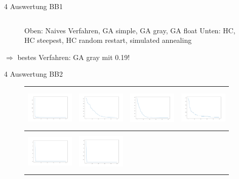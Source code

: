 \documentclass{ocbeameruni}
\begin{document}
\begin{frame}{4 Auswertung BB1}
\begin{center}
\begin{figure}
\begin{tabular}{|c|c|c|c|}
    \end{tabular}
    \caption{Oben: Naives Verfahren, GA simple, GA gray, GA float \hspace{\textwidth}Unten: HC, HC steepest, HC random restart, simulated annealing}
    \end{figure}
    $\Rightarrow$ bestes Verfahren: GA gray mit 0.19!
    \end{center}
\end{frame}

\begin{frame}{4 Auswertung BB2}
    \begin{center}
    \begin{figure}
    \begin{tabular}{|c|c|c|c|} 
      \hline
      \includegraphics[width=23mm, height=20mm]{plots/bb2_naive.png} 
    & \includegraphics[width=23mm, height=20mm]{plots/bb2_ga_simple.png} 
    & \includegraphics[width=23mm, height=20mm]{plots/bb2_ga_gray.png}
    & \includegraphics[width=23mm, height=20mm]{plots/bb2_ga_float.png} \\ \hline
      \includegraphics[width=23mm, height=20mm]{plots/bb2_hc.png} 
    & \includegraphics[width=23mm, height=20mm]{plots/bb2_hc_sa.png} 

\end{tabular}
\end{figure}
\end{center}
\end{frame}
\end{document}
